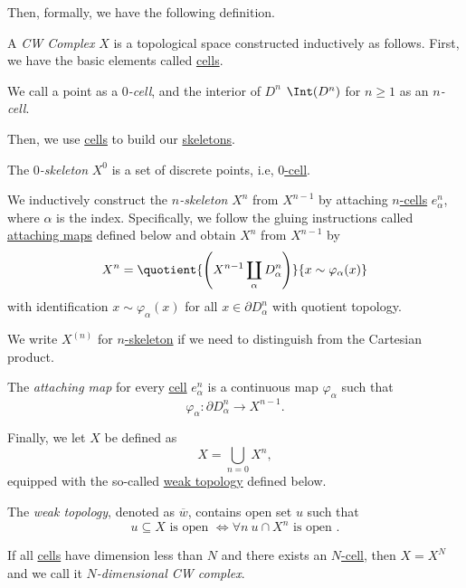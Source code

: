 Then, formally, we have the following definition.
\begin{definition}[CW Complex]\label{def:CW-Complex}
	A \emph{CW Complex} \(X\) is a topological space constructed inductively as follows. First, we have the basic elements called \hyperref[def:cell]{cells}.

	\begin{definition}[Cell]\label{def:cell}
		We call a point as a \emph{\(0\)-cell}, and the interior of \(D^n\) \(\Int (D^n)\) for \(n\geq 1\) as an \emph{\(n\)-cell}.
	\end{definition}
	Then, we use \hyperref[def:cell]{cells} to build our \hyperref[def:skeleton]{skeletons}.

	\begin{definition}[Skeleton]\label{def:skeleton}
		\item The \emph{\(0\)-skeleton} \(X^0\) is a set of discrete points, i.e, \hyperref[def:cell]{\(0\)-cell}.
		\item We inductively construct the \emph{\(n\)-skeleton} \(X^n\) from \(X^{n-1}\) by attaching \hyperref[def:cell]{\(n\)-cells} \(e^n_{\alpha}\), where
		\(\alpha\) is the index. Specifically, we follow the gluing instructions called \hyperref[def:attaching-map]{attaching maps} defined below and obtain \(X^n\)
		from \(X^{n-1}\) by
		\[
			X^n = \quotient{\left(X^{n-1}\coprod\limits_{\alpha}D^n_\alpha\right)}{x\sim \varphi_{\alpha}(x)}
		\]
		with identification \(x\sim \varphi_{\alpha}(x)\) for all \(x\in \partial D^n_{\alpha}\) with quotient topology.
		\begin{remark}
			We write \(X^{(n)}\) for \hyperref[def:skeleton]{\(n\)-skeleton} if we need to distinguish from the Cartesian product.
		\end{remark}
	\end{definition}

	\begin{definition}\label{def:attaching-map}
		The \emph{attaching map} for every \hyperref[def:cell]{cell} \(e^n_\alpha \) is a continuous map \(\varphi_{\alpha}\) such that
		\[
			\varphi_{\alpha}\colon \partial D^n_{\alpha}\to X^{n-1}.
		\]
	\end{definition}

	Finally, we let \(X\) be defined as
	\[
		X = \bigcup\limits_{n=0} X^n,
	\]
	equipped with the so-called \hyperref[def:weak-topology]{weak topology} defined below.

	\begin{definition}\label{def:weak-topology}
		The \emph{weak topology}, denoted as \(\overline{w} \), contains open set \(u\) such that
		\[
			u\subseteq X \text{ is open }\iff \forall n\ u\cap X^n \text{ is open }.
		\]
	\end{definition}

	If all \hyperref[def:cell]{cells} have dimension less than \(N\) and there exists an \hyperref[def:cell]{\(N\)-cell}, then
	\(X = X^N\) and we call it \emph{\(N\)-dimensional CW complex}.
\end{definition}

